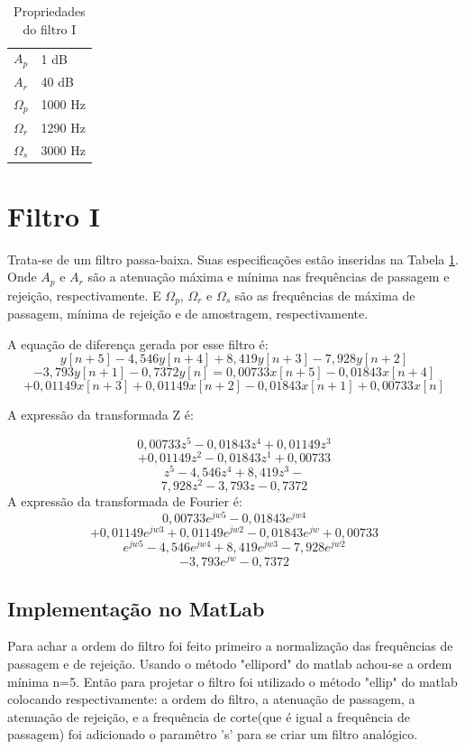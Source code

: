 \documentclass[a4paper,10pt]{article}
\begin{document}
\begin{table}
\centering
\begin{tabular}{|l|l|}

\(A_p\) 	& 1 dB		\\
\(A_r\) 	& 40 dB		\\
\(\Omega_p\) 	& 1000 Hz	\\
\(\Omega_r\) 	& 1290 Hz	\\
\(\Omega_s\) 	& 3000 Hz	\\

\end{tabular}
\caption{Propriedades do filtro I}
\label{tab:tabfiltro1}
\end{table}

\section{Filtro I}
Trata-se de um filtro passa-baixa. Suas especificações estão inseridas na Tabela \ref{tab:tabfiltro1}. Onde \(A_p\) e \(A_r\) são a atenuação máxima e mínima nas frequências de passagem e rejeição, respectivamente. E \(\Omega_p\), \(\Omega_r\) e \(\Omega_s\) são as frequências de máxima de passagem, mínima de rejeição e de amostragem, respectivamente. 
 

A equação de diferença gerada por esse filtro é: 
\[y[n+5] - 4,546y[n+4] + 8,419y[n+3] - 7,928y[n+2] \]
\[- 3,793y[n+1] - 0,7372y[n] = 0,00733x[n+5] - 0,01843x[n+4]\]
\[ + 0,01149x[n+3] + 0,01149x[n+2] - 0,01843x[n+1] + 0,00733x[n] \]

A expressão da transformada Z é:

\[0,00733z^5 - 0,01843z^4 + 0,01149z^3\]
\[+ 0,01149z^2 - 0,01843z^1 + 0,00733 \]
\hline
\[ z^5 - 4,546z^4 + 8,419z^3 - \]
\[7,928z^2 - 3,793z - 0,7372 \]
A expressão da transformada de Fourier é:
\[0,00733e^{jw5} - 0,01843e^{jw4}\]
\[ + 0,01149e^{jw3} + 0,01149e^{jw2} - 0,01843e^{jw} + 0,00733 \]
\hline
\[ e^{jw5} - 4,546e^{jw4} + 8,419e^{jw3} - 7,928e^{jw2}\] 
\[ - 3,793e^{jw} - 0,7372\]

\subsection{Implementação no MatLab}
Para achar a ordem do filtro foi feito primeiro a normalização das frequências de passagem
e de rejeição. Usando o método "ellipord" do matlab achou-se a ordem mínima n=5. Então para projetar
o filtro foi utilizado o método "ellip" do matlab colocando respectivamente: a ordem do filtro,
a atenuação de passagem, a atenuação de rejeição, e a frequência de corte(que é igual a frequência
de passagem) foi adicionado o paramêtro 's' para se criar um filtro analógico.
\end{document}
